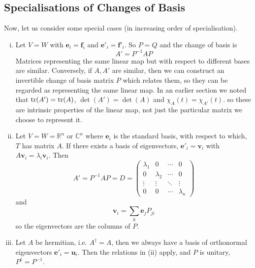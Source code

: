 \documentclass{article}
\begin{document}
\subsection{Specialisations of Changes of Basis}
Now, let us consider some special cases (in increasing order of specialisation).
\begin{enumerate}[(i)]
	\item Let $V=W$ with $\bm e_i = \bm f_i$ and $\bm e'_i = \bm f'_i$. So $P=Q$ and the change of basis is
	      \[ A' = P^{-1}AP \]
	      Matrices representing the same linear map but with respect to different bases are similar. Conversely, if $A, A'$ are similar, then we can construct an invertible change of basis matrix $P$ which relates them, so they can be regarded as representing the same linear map. In an earlier section we noted that $\tr(A') = \tr(A)$, $\det(A') = \det(A)$ and $\chi_A(t) = \chi_{A'}(t)$. so these are intrinsic properties of the linear map, not just the particular matrix we choose to represent it.
	\item Let $V=W=\mathbb R^n$ or $\mathbb C^n$ where $\bm e_i$ is the standard basis, with respect to which, $T$ has matrix $A$. If there exists a basis of eigenvectors, $\bm e'_i = \bm v_i$ with $A\bm v_i = \lambda_i\bm v_i$. Then
	      \[ A' = P^{-1}AP = D = \begin{pmatrix}
			      \lambda_1 & 0         & \cdots & 0         \\
			      0         & \lambda_2 & \cdots & 0         \\
			      \vdots    & \vdots    & \ddots & \vdots    \\
			      0         & 0         & \cdots & \lambda_n
		      \end{pmatrix} \]
	      and
	      \[ \bm v_i = \sum_k \bm e_j P_{ji} \]
	      so the eigenvectors are the columns of $P$.
	\item Let $A$ be hermitian, i.e. $A^\dagger = A$, then we always have a basis of orthonormal eigenvectors $\bm e'_i = \bm u_i$. Then the relations in (ii) apply, and $P$ is unitary, $P^\dagger = P^{-1}$.
\end{enumerate}
\end{document}
